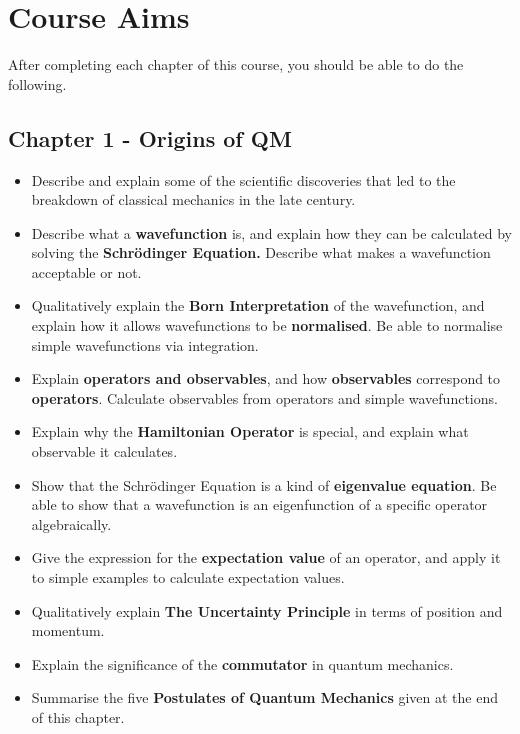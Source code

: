 \documentclass{memoir}[11pt,oneside,a4paper,openany]
\begin{document}
\chapter*{Course Aims}
After completing each chapter of this course, you should be able to do the following.
\section*{Chapter 1 - Origins of QM}
\begin{itemize}
	\item Describe and explain some of the scientific discoveries that led to the breakdown of classical mechanics in the late  century.
	\item Describe what a \textbf{wavefunction} is, and explain how they can be calculated by solving the \textbf{Schr{\"o}dinger Equation.} Describe what makes a wavefunction acceptable or not.
	\item Qualitatively explain the \textbf{Born Interpretation} of the wavefunction, and explain how it allows wavefunctions to be \textbf{normalised}. Be able to normalise simple wavefunctions via integration.
	\item Explain \textbf{operators and observables}, and how \textbf{observables} correspond to \textbf{operators}. Calculate observables from operators and simple wavefunctions.
	\item Explain why the \textbf{Hamiltonian Operator} is special, and explain what observable it calculates.
	\item Show that the Schr{\"o}dinger Equation is a kind of \textbf{eigenvalue equation}. Be able to show that a wavefunction is an eigenfunction of a specific operator algebraically.
	\item Give the expression for the \textbf{expectation value} of an operator, and apply it to simple examples to calculate expectation values.
	\item Qualitatively explain \textbf{The Uncertainty Principle} in terms of position and momentum. 
	\item Explain the significance of the \textbf{commutator} in quantum mechanics.
	\item Summarise the five \textbf{Postulates of Quantum Mechanics} given at the end of this chapter.
\end{itemize}
\end{document}
